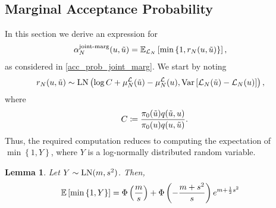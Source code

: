 \documentclass[12pt]{article}
\newtheorem{lemma}{Lemma}
\begin{document}
\subsection{Marginal Acceptance Probability}
In this section we derive an expression for 
\begin{align}
\llikEmJointMarg[\Ndesign]{\accProbMH}(\Par, \propPar) 
&= \E_{\llikEm[\Ndesign]} \left[\min\left\{1, \Em[\Ndesign]{\accProbRatio}(\Par, \propPar)\right\} \right], 
\end{align}
as considered in \ref{acc_prob_joint_marg}. We start by noting 
\begin{align}
\Em[\Ndesign]{\accProbRatio}(\Par, \propPar)
&\sim \LN\left(\log C + \emMean[\Ndesign]{\llik}(\propPar) - \emMean[\Ndesign]{\llik}(\Par), \Var\left[\llikEm[\Ndesign](\propPar) - \llikEm[\Ndesign](\Par) \right] \right),
\label{acc_ratio_LN}
\end{align}
where 
\begin{align*}
C \Def \frac{\priorDens(\propPar) \propDens(\propPar, \Par)}{\priorDens(\Par) \propDens(\Par, \propPar)}.
\end{align*}
Thus, the required computation reduces to computing the expectation of $\min\left\{1, Y \right\}$, where $Y$ is a log-normally distributed 
random variable. 

\begin{lemma} \label{lemma:exp_max_one_LN}
Let $Y \sim \LN(m, s^2)$. Then, 
\begin{align}
\E\left[\min\left\{1, Y \right\} \right] &= \GaussianCDF\left(\frac{m}{s} \right) + \GaussianCDF\left(-\frac{m + s^2}{s} \right) e^{m + \frac{1}{2}s^2}
\end{align}
\end{lemma}
\end{document}

